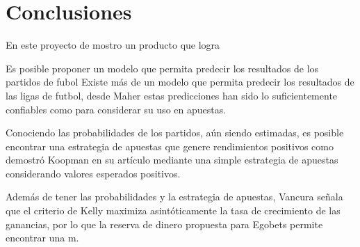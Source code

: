 %
\chapter{Conclusiones}

En este proyecto de mostro un producto que logra 


Es posible proponer un modelo que permita predecir los resultados de los partidos de fubol 
Existe más de un modelo que permita predecir los resultados de las ligas de futbol, desde Maher \cite{maher1982modelling} estas predicciones han sido lo suficientemente confiables como para considerar su uso en apuestas.

Conociendo las probabilidades de los partidos, aún siendo estimadas, es posible encontrar una estrategia de apuestas que genere rendimientos positivos como demostró Koopman en su artículo \cite{koopman2013dynamic} mediante una simple estrategia de apuestas considerando valores esperados positivos.

Además de tener las probabilidades y la estrategia de apuestas, Vancura \cite{vancura2000finding} señala que el criterio de Kelly \cite{kelly1956new} maximiza asintóticamente la tasa de crecimiento de las ganancias, por lo que la reserva de dinero propuesta para Egobets permite encontrar una m.

